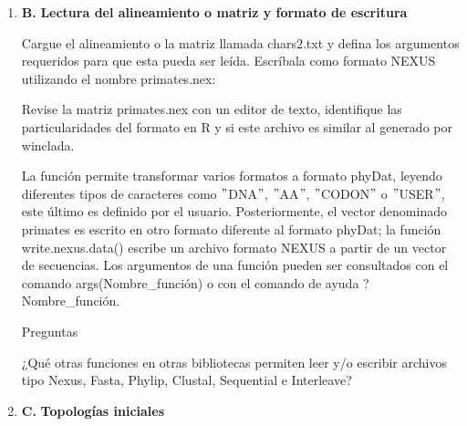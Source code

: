 \begin{itemize}
\begin{enumerate}
El comando  permite hacer la descarga de los paquetes directamente del repositorio desde el entorno de R. Tambi\'en es posible hacer la descarga directamente de la pagina web e instalarlo desde cualquier directorio en el ordenador dando directamente la ruta a dicho sitio: 
Tenga en cuenta que de este modo deberá descargar e instalar todas las dependencias requeridas por el paquete de manera independiente. El comando library() le permitir\'a cargar el paquete en el entorno de R para poder empezar a trabajar con todas sus utilidades.


\item{\textbf{B. }}\textbf{Lectura del alineamiento o matriz y formato de escritura}

Cargue el alineamiento o la matriz llamada chars2.txt  y defina los argumentos requeridos para que esta pueda ser le\'ida. 
Escr\'ibala como formato NEXUS utilizando el nombre primates.nex:

Revise la matriz primates.nex con un editor de texto,  identifique las particularidades del formato en R y si este archivo es similar al generado por winclada.

La funci\'on  permite transformar varios formatos a formato phyDat,  leyendo diferentes tipos de caracteres como $"$DNA$"$,  $"$AA$"$,  $"$CODON$"$ o $"$USER$"$,  este \'ultimo es definido por el usuario. Posteriormente,  el vector denominado primates es escrito en otro formato diferente al formato phyDat; la función write.nexus.data() escribe un archivo formato NEXUS a partir de un vector de secuencias. Los argumentos de una función pueden ser consultados con el comando  
args(Nombre\_funci\'on) o con el comando de ayuda ?Nombre\_funci\'on.


{Preguntas}

¿Qu\'e otras funciones en otras bibliotecas permiten leer y/o escribir archivos tipo Nexus,  Fasta,  Phylip,  Clustal,  Sequential e Interleave?\\

\item{\textbf{C. }}\textbf{Topolog\'ias iniciales}


\end{enumerate}
\end{itemize}
